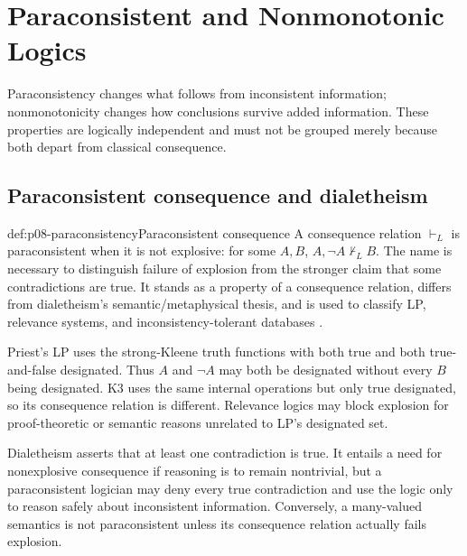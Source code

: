 \chapter{Paraconsistent and Nonmonotonic Logics}
\label{sec:p08-paraconsistent-and-nonmonotonic}

Paraconsistency changes what follows from inconsistent information;
nonmonotonicity changes how conclusions survive added information. These
properties are logically independent and must not be grouped merely because
both depart from classical consequence.

\section{Paraconsistent consequence and dialetheism}

\begin{hbdefinition}{def:p08-paraconsistency}{Paraconsistent consequence}
A consequence relation \(\vdash_L\) is paraconsistent when it is not explosive:
for some \(A,B\), \(A,\neg A\nvdash_L B\). The name is necessary to distinguish
failure of explosion from the stronger claim that some contradictions are
true. It stands as a property of a consequence relation, differs from
dialetheism's semantic/metaphysical thesis, and is used to classify LP,
relevance systems, and inconsistency-tolerant databases
\cite{Priest1979,Priest2006,OmoriWansing2017}.
\end{hbdefinition}

Priest's LP uses the strong-Kleene truth functions with both true and both
true-and-false designated. Thus \(A\) and \(\neg A\) may both be designated
without every \(B\) being designated. K3 uses the same internal operations but
only true designated, so its consequence relation is different. Relevance
logics may block explosion for proof-theoretic or semantic reasons unrelated
to LP's designated set.

Dialetheism asserts that at least one contradiction is true. It entails a need
for nonexplosive consequence if reasoning is to remain nontrivial, but a
paraconsistent logician may deny every true contradiction and use the logic
only to reason safely about inconsistent information. Conversely, a many-valued
semantics is not paraconsistent unless its consequence relation actually fails
explosion.

